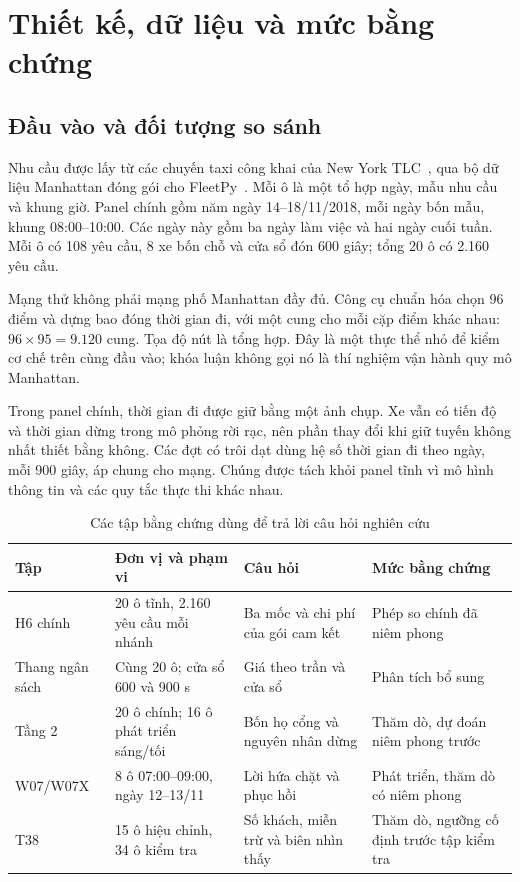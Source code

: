 \section{Thiết kế, dữ liệu và mức bằng chứng}


\subsection{Đầu vào và đối tượng so sánh}

Nhu cầu được lấy từ các chuyến taxi công khai của New York TLC~\cite{tlc}, qua bộ dữ
liệu Manhattan đóng gói cho FleetPy~\cite{fleetpy2022}. Mỗi ô là một tổ hợp ngày, mẫu nhu
cầu và khung giờ. Panel chính gồm năm ngày 14--18/11/2018, mỗi ngày bốn mẫu, khung
08:00--10:00. Các ngày này gồm ba ngày làm việc và hai ngày cuối tuần. Mỗi ô có 108 yêu
cầu, 8 xe bốn chỗ và cửa sổ đón 600 giây; tổng 20 ô có 2.160 yêu cầu.

Mạng thử không phải mạng phố Manhattan đầy đủ. Công cụ chuẩn hóa chọn 96 điểm và dựng
bao đóng thời gian đi, với một cung cho mỗi cặp điểm khác nhau: $96\times95=9.120$ cung.
Tọa độ nút là tổng hợp. Đây là một thực thể nhỏ để kiểm cơ chế trên cùng đầu vào; khóa luận
không gọi nó là thí nghiệm vận hành quy mô Manhattan.

Trong panel chính, thời gian đi được giữ bằng một ảnh chụp. Xe vẫn có tiến độ và thời gian
dừng trong mô phỏng rời rạc, nên phần thay đổi khi giữ tuyến không nhất thiết bằng không.
Các đợt có trôi dạt dùng hệ số thời gian đi theo ngày, mỗi 900 giây, áp chung cho mạng.
Chúng được tách khỏi panel tĩnh vì mô hình thông tin và các quy tắc thực thi khác nhau.

\begin{table}[htbp]
\centering
\caption{Các tập bằng chứng dùng để trả lời câu hỏi nghiên cứu}
\label{bang:lotrinh}
\small
\begin{tabularx}{\linewidth}{@{}p{2.5cm}p{3.4cm}Xp{3.2cm}@{}}
\toprule
\textbf{Tập} & \textbf{Đơn vị và phạm vi} & \textbf{Câu hỏi} & \textbf{Mức bằng chứng}\\
\midrule
H6 chính & 20 ô tĩnh, 2.160 yêu cầu mỗi nhánh & Ba mốc và chi phí của gói cam kết & Phép so chính đã niêm phong\\
Thang ngân sách & Cùng 20 ô; cửa sổ 600 và 900 s & Giá theo trần và cửa sổ & Phân tích bổ sung\\
Tầng 2 & 20 ô chính; 16 ô phát triển sáng/tối & Bốn họ cổng và nguyên nhân dừng & Thăm dò, dự đoán niêm phong trước\\
W07/W07X & 8 ô 07:00--09:00, ngày 12--13/11 & Lời hứa chặt và phục hồi & Phát triển, thăm dò có niêm phong\\
T38 & 15 ô hiệu chỉnh, 34 ô kiểm tra & Số khách, miễn trừ và biên nhìn thấy & Thăm dò, ngưỡng cố định trước tập kiểm tra\\
\bottomrule
\end{tabularx}
\end{table}

